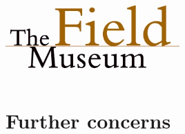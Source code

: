 \documentclass{beamer}
\begin{document}
\begin{frame}
\begin{columns}
\begin{column}{0.5\textwidth}
      \includegraphics[height = 0.3\textheight, width = 0.5\textwidth, keepaspectratio = true]{figure/field} \\
    \end{column}
  \end{columns}
\end{frame}



\appendix
\section{Further concerns}
\end{document}
